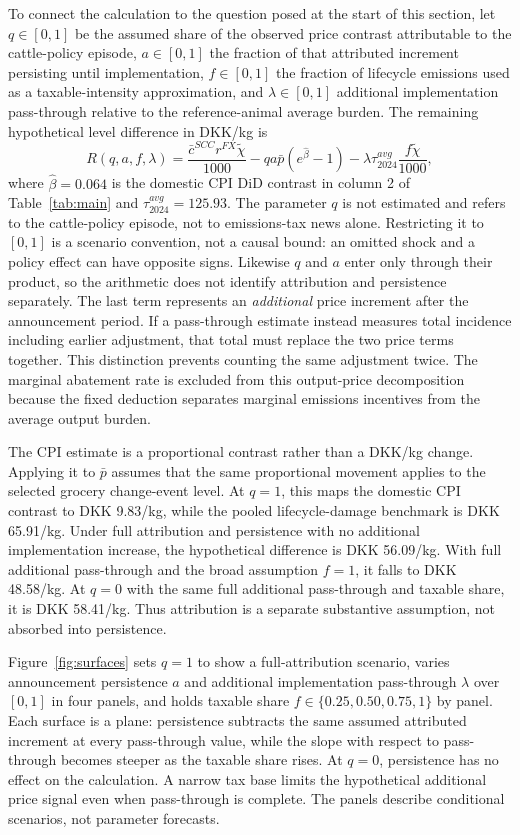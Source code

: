 \documentclass[11pt]{article}
\begin{document}
To connect the calculation to the question posed at the start of this section, let $q\in[0,1]$ be the assumed share of the observed price contrast attributable to the cattle-policy episode, $a\in[0,1]$ the fraction of that attributed increment persisting until implementation, $f\in[0,1]$ the fraction of lifecycle emissions used as a taxable-intensity approximation, and $\lambda\in[0,1]$ additional implementation pass-through relative to the reference-animal average burden. The remaining hypothetical level difference in DKK/kg is
\begin{equation}\label{eq:persistence_gap}
R(q,a,f,\lambda)=\frac{\bar c^{SCC}r^{FX}\widetilde\chi}{1000}
-qa\bar p(e^{\widehat\beta}-1)
-\lambda\tau^{avg}_{2024}\frac{f\widetilde\chi}{1000},
\end{equation}
where $\widehat\beta=0.064$ is the domestic CPI DiD contrast in column 2 of Table~\ref{tab:main} and $\tau^{avg}_{2024}=125.93$. The parameter $q$ is not estimated and refers to the cattle-policy episode, not to emissions-tax news alone. Restricting it to $[0,1]$ is a scenario convention, not a causal bound: an omitted shock and a policy effect can have opposite signs. Likewise $q$ and $a$ enter only through their product, so the arithmetic does not identify attribution and persistence separately. The last term represents an \emph{additional} price increment after the announcement period. If a pass-through estimate instead measures total incidence including earlier adjustment, that total must replace the two price terms together. This distinction prevents counting the same adjustment twice. The marginal abatement rate is excluded from this output-price decomposition because the fixed deduction separates marginal emissions incentives from the average output burden.

The CPI estimate is a proportional contrast rather than a DKK/kg change. Applying it to $\bar p$ assumes that the same proportional movement applies to the selected grocery change-event level. At $q=1$, this maps the domestic CPI contrast to DKK 9.83/kg, while the pooled lifecycle-damage benchmark is DKK 65.91/kg. Under full attribution and persistence with no additional implementation increase, the hypothetical difference is DKK 56.09/kg. With full additional pass-through and the broad assumption $f=1$, it falls to DKK 48.58/kg. At $q=0$ with the same full additional pass-through and taxable share, it is DKK 58.41/kg. Thus attribution is a separate substantive assumption, not absorbed into persistence.

Figure~\ref{fig:surfaces} sets $q=1$ to show a full-attribution scenario, varies announcement persistence $a$ and additional implementation pass-through $\lambda$ over $[0,1]$ in four panels, and holds taxable share $f\in\{0.25,0.50,0.75,1\}$ by panel. Each surface is a plane: persistence subtracts the same assumed attributed increment at every pass-through value, while the slope with respect to pass-through becomes steeper as the taxable share rises. At $q=0$, persistence has no effect on the calculation. A narrow tax base limits the hypothetical additional price signal even when pass-through is complete. The panels describe conditional scenarios, not parameter forecasts.
\end{document}
